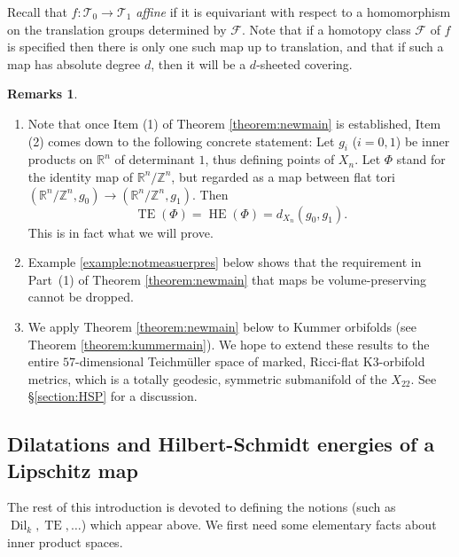 \documentclass[11pt,letterpaper]{amsart}
\theoremstyle{definition}
\numberwithin{equation}{section}
\theoremstyle{definition}
\newtheorem{remarks}[theorem]{Remarks}
\newcommand{\Fc}{\mathcal{F}}
\newcommand{\Tc}{\mathcal{T}}
\newcommand{\Rb}{\mathbb{R}}
\newcommand{\Zb}{\mathbb{Z}}
\DeclareMathOperator{\TE}{TE}
\DeclareMathOperator{\HE}{HE}
\newcommand{\Dil}{\operatorname{Dil}}
\begin{document}
Recall that $f:\Tc_0\to \Tc_1$ \emph{affine} if it is equivariant with respect to a homomorphism on the translation groups determined by $\Fc$.  Note that if a homotopy class $\Fc$ of $f$ 
is specified then there is only one such map up to translation, and that if such a map has absolute degree $d$, then it will be a $d$-sheeted covering.


\begin{remarks}\label{rems:main}
\ 
\begin{enumerate}

\item Note that once Item (1) of Theorem \ref{theorem:newmain} is established, 
Item (2) comes down to the following concrete statement:
Let $g_i$ ($i=0,1$)  be inner products on $\Rb^n$ of determinant $1$, thus defining  points of $X_n$.
Let $\Phi$ stand for the identity map of $\Rb^n/\Zb^n$, but  regarded as a map between flat tori 
$(\Rb^n/\Zb^n, g_0)\to (\Rb^n/\Zb^n, g_1)$. Then 
\[\TE(\Phi)=\HE(\Phi)=d_{X_n}(g_0, g_1).\] This is  in fact what we will prove. 

\item Example \ref{example:notmeasuerpres} below shows that the requirement in Part~(1) of  Theorem \ref{theorem:newmain} that maps be volume-preserving cannot be dropped.  



\item We apply Theorem \ref{theorem:newmain} 
below to Kummer orbifolds (see Theorem \ref{theorem:kummermain}).  We hope to extend these results to the entire $57$-dimensional Teichm\"uller space of marked, Ricci-flat K3-orbifold metrics, 
which is a totally geodesic, symmetric submanifold of the  $X_{22}$. See \S\ref{section:HSP} for a discussion.
\end{enumerate}
\end{remarks}

\subsection{Dilatations  and Hilbert-Schmidt energies of a Lipschitz map} The rest of this introduction is devoted to defining the notions  (such as   $\Dil_k, \TE, \dots$) which appear above. We first need some elementary facts about inner product spaces. 
\end{document}
